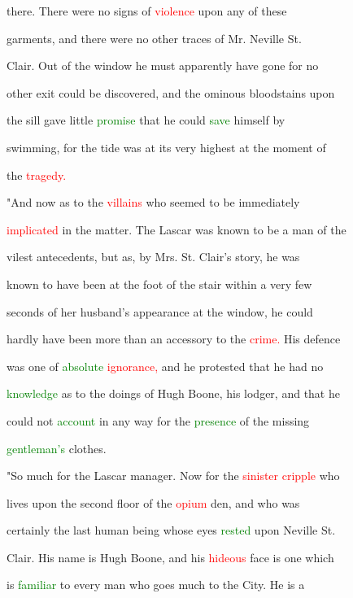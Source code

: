  there. There were no signs of \textcolor{red}{violence} upon any of these

 garments, and there were no other traces of Mr. Neville St.

 Clair. Out of the window he must apparently have gone for no

 other exit could be discovered, and the \textcolor{BurntOrange}{ominous} bloodstains upon

 the sill gave little \textcolor{green}{promise} that he could \textcolor{green}{save} himself by

 \textcolor{BurntOrange}{swimming,} for the tide was at its very highest at the moment of

 the \textcolor{red}{tragedy.}



 "And now as to the \textcolor{red}{villains} who seemed to be \textcolor{BurntOrange}{immediately}

 \textcolor{red}{implicated} in the matter. The Lascar was known to be a man of the

 vilest antecedents, but as, by Mrs. St. Clair's story, he was

 known to have been at the foot of the stair within a very few

 seconds of her husband's appearance at the window, he could

 hardly have been more than an accessory to the \textcolor{red}{crime.} His defence

 was one of \textcolor{green}{absolute} \textcolor{red}{ignorance,} and he protested that he had no

 \textcolor{green}{knowledge} as to the doings of Hugh Boone, his lodger, and that he

 could not \textcolor{green}{account} in any way for the \textcolor{green}{presence} of the missing

 \textcolor{green}{gentleman's} clothes.



 "So much for the Lascar manager. Now for the \textcolor{red}{sinister} \textcolor{red}{cripple} who

 lives upon the second floor of the \textcolor{red}{opium} den, and who was

 certainly the last human being whose eyes \textcolor{green}{rested} upon Neville St.

 Clair. His name is Hugh Boone, and his \textcolor{red}{hideous} face is one which

 is \textcolor{green}{familiar} to every man who goes much to the City. He is a

